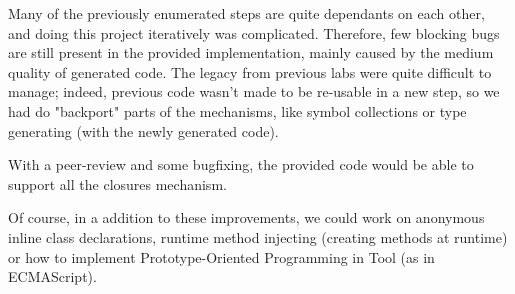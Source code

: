 Many of the previously enumerated steps are quite dependants on each other,
and doing this project iteratively was complicated. Therefore, few blocking
bugs are still present in the provided implementation, mainly caused by the
medium quality of generated code. The legacy from previous labs were quite difficult
to manage; indeed, previous code wasn't made to be re-usable in a new step,
so we had do "backport" parts of the mechanisms, like symbol collections or
type generating (with the newly generated code).

With a peer-review and some bugfixing, the provided code would be able to
support all the closures mechanism.

Of course, in a addition to these improvements, we could work on anonymous inline class
declarations, runtime method injecting (creating methods at runtime) or how to
implement Prototype-Oriented Programming in Tool (as in ECMAScript).
